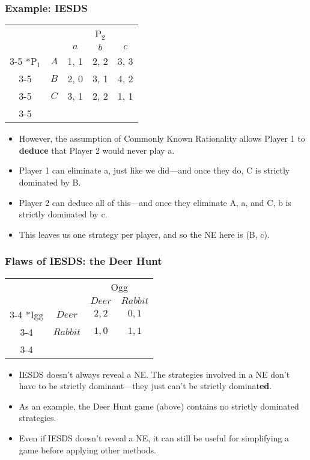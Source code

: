 \begin{frame}
\frametitle{Example: IESDS}
\begin{table}[h]
\centering
\setlength{\extrarowheight}{2pt}
\begin{tabular}{cc|c|c|c|}
	& \multicolumn{1}{c}{} & \multicolumn{3}{c}{P$_2$}\\
	& \multicolumn{1}{c}{} & \multicolumn{1}{c}{$a$} & \multicolumn{1}{c}{$b$} & \multicolumn{1}{c}{$c$} \\\cline{3-5}
	\multirow{3}*{P$_1$}  & $A$ & 1, 1 & 2, 2 & 3, 3 \\\cline{3-5}
	& $B$ & 2, 0 & 3, 1 & 4, 2 \\\cline{3-5}
	& $C$ & 3, 1 & 2, 2 & 1, 1  \\\cline{3-5}
\end{tabular}
\end{table}
\begin{itemize}
	\item However, the assumption of Commonly Known Rationality allows Player 1 to \textbf{deduce} that Player 2 would never play a.
	\item Player 1 can eliminate a, just like we did---and once they do, C is strictly dominated by B.
	\item Player 2 can deduce all of this---and once they eliminate A, a, and C, b is strictly dominated by c.
	\item This leaves us one strategy per player, and so the NE here is (B, c).
\end{itemize}
\end{frame}

\begin{frame}
\frametitle{Flaws of IESDS: the Deer Hunt}
\begin{table}[h]
\centering
\setlength{\extrarowheight}{2pt}
\begin{tabular}{cc|c|c|}
	& \multicolumn{1}{c}{} & \multicolumn{2}{c}{Ogg}\\
	& \multicolumn{1}{c}{} & \multicolumn{1}{c}{$Deer$}  & \multicolumn{1}{c}{$Rabbit$} \\\cline{3-4}
	\multirow{2}*{Igg}  & $Deer$ & $2,2$ & $0,1$ \\\cline{3-4}
	& $Rabbit$ & $1,0$ & $1,1$ \\\cline{3-4}
\end{tabular}
\end{table}
\begin{itemize}
	\item IESDS doesn't always reveal a NE. The strategies involved in a NE don't have to be strictly dominant---they just can't be strictly dominat\textbf{ed}.
	\item As an example, the Deer Hunt game (above) contains no strictly dominated strategies.
	\item Even if IESDS doesn't reveal a NE, it can still be useful for simplifying a game before applying other methods.
\end{itemize}
\end{frame}

